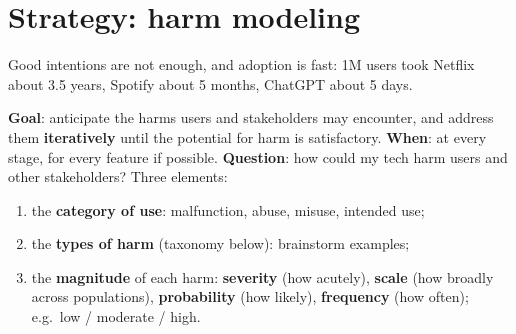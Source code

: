\documentclass[11pt,a4paper,openany]{book}
\begin{document}
\section{Strategy: harm modeling}

\begin{rembox}[title={Why?}]
Good intentions are not enough, and adoption is fast: 1M users took Netflix about 3.5 years,
Spotify about 5 months, ChatGPT about 5 days.
\end{rembox}

\begin{algbox}[title={Applying the strategy (cheat sheet 1.7)}]
\textbf{Goal}: anticipate the harms users and stakeholders may encounter, and address them
\textbf{iteratively} until the potential for harm is satisfactory. \textbf{When}: at every stage,
for every feature if possible. \textbf{Question}: how could my tech harm users and other
stakeholders? Three elements:
\begin{enumerate}
  \item the \textbf{category of use}: malfunction, abuse, misuse, intended use;
  \item the \textbf{types of harm} (taxonomy below): brainstorm examples;
  \item the \textbf{magnitude} of each harm: \textbf{severity} (how acutely), \textbf{scale}
        (how broadly across populations), \textbf{probability} (how likely), \textbf{frequency}
        (how often); e.g.\ low / moderate / high.
\end{enumerate}
\end{algbox}
\end{document}
